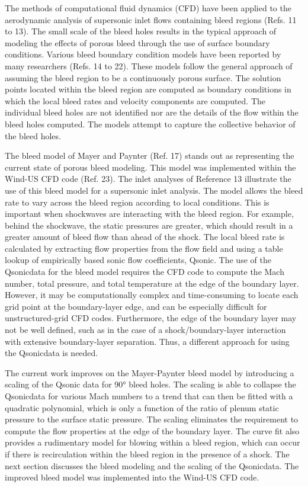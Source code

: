 The methods of computational fluid dynamics (CFD) have been applied to the aerodynamic analysis of supersonic inlet flows containing bleed regions (Refs. 11 to 13). The small scale of the bleed holes results in the typical approach of modeling the effects of porous bleed through the use of surface boundary conditions. Various bleed boundary condition models have been reported by many researchers (Refs. 14 to 22). These models follow the general approach of assuming the bleed region to be a continuously porous surface. The solution points located within the bleed region are computed as boundary conditions in which the local bleed rates and velocity components are computed. The individual bleed holes are not identified nor are the details of the flow within the bleed holes computed. The models attempt to capture the collective behavior of the bleed holes.

The bleed model of Mayer and Paynter (Ref. 17) stands out as representing the current state of porous bleed modeling. This model was implemented within the Wind-US CFD code (Ref. 23). The inlet analyses of Reference 13 illustrate the use of this bleed model for a supersonic inlet analysis. The model allows the bleed rate to vary across the bleed region according to local conditions. This is important when shockwaves are interacting with the bleed region. For example, behind the shockwave, the static pressures are greater, which should result in a greater amount of bleed flow than ahead of the shock. The local bleed rate is calculated by extracting flow properties from the flow field and using a table lookup of empirically based sonic flow coefficients, Qsonic. The use of the Qsonicdata for the bleed model requires the CFD code to compute the Mach number, total pressure, and total temperature at the edge of the boundary layer. However, it may be computationally complex and time-consuming to locate each grid point at the boundary-layer edge, and can be especially difficult for unstructured-grid CFD codes. Furthermore, the edge of the boundary layer may not be well defined, such as in the case of a shock/boundary-layer interaction with extensive boundary-layer separation. Thus, a different approach for using the Qsonicdata is needed.

The current work improves on the Mayer-Paynter bleed model by introducing a scaling of the Qsonic data for 90° bleed holes. The scaling is able to collapse the Qsonicdata for various Mach numbers to a trend that can then be fitted with a quadratic polynomial, which is only a function of the ratio of plenum static pressure to the surface static pressure. The scaling eliminates the requirement to compute the flow properties at the edge of the boundary layer. The curve fit also provides a rudimentary model for blowing within a bleed region, which can occur if there is recirculation within the bleed region in the presence of a shock. The next section discusses the bleed modeling and the scaling of the Qsonicdata. The improved bleed model was implemented into the Wind-US CFD code.

